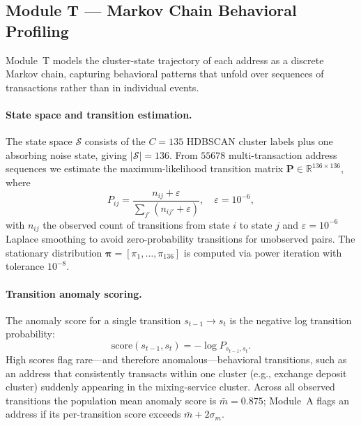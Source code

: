 \subsection{Module T — Markov Chain Behavioral Profiling}
\label{sec:module_t}

Module~T models the cluster-state trajectory of each address as a discrete
Markov chain, capturing behavioral patterns that unfold over sequences of
transactions rather than in individual events.

\paragraph{State space and transition estimation.}
The state space $\mathcal{S}$ consists of the $C = 135$ HDBSCAN cluster
labels plus one absorbing noise state, giving $|\mathcal{S}| = 136$.
From $\num{55678}$ multi-transaction address sequences we estimate the
maximum-likelihood transition matrix
$\mathbf{P} \in \mathbb{R}^{136 \times 136}$, where
\begin{equation}
  P_{ij} = \frac{n_{ij} + \varepsilon}{\sum_{j'} (n_{ij'} + \varepsilon)},
  \quad \varepsilon = 10^{-6},
  \label{eq:markov_transition}
\end{equation}
with $n_{ij}$ the observed count of transitions from state $i$ to state $j$
and $\varepsilon = 10^{-6}$ Laplace smoothing to avoid zero-probability
transitions for unobserved pairs.
The stationary distribution $\boldsymbol{\pi} = [\pi_1, \ldots, \pi_{136}]$
is computed via power iteration with tolerance $10^{-8}$.

\paragraph{Transition anomaly scoring.}
The anomaly score for a single transition $s_{t-1} \to s_t$ is the negative
log transition probability:
\begin{equation}
  \mathrm{score}(s_{t-1}, s_t) = -\log P_{s_{t-1}, s_t}.
  \label{eq:markov_score}
\end{equation}
High scores flag rare—and therefore anomalous—behavioral transitions, such as
an address that consistently transacts within one cluster (e.g., exchange
deposit cluster) suddenly appearing in the mixing-service cluster.
Across all observed transitions the population mean anomaly score is
$\bar{m} = 0.875$; Module~A flags an address if its per-transition score
exceeds $\bar{m} + 2\sigma_m$.

